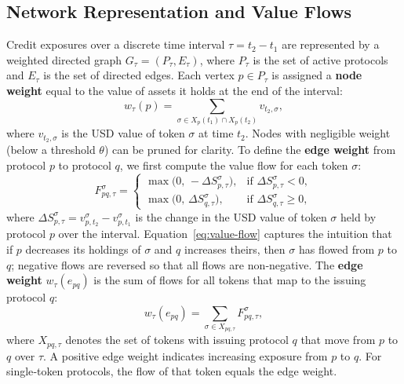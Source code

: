 \subsection{Network Representation and Value Flows}

Credit exposures over a discrete time interval $\tau = t_2 - t_1$ are represented by a weighted directed graph $G_\tau = (P_\tau, E_\tau)$, where $P_\tau$ is the set of active protocols and $E_\tau$ is the set of directed edges.  Each vertex $p\in P_\tau$ is assigned a \textbf{node weight} equal to the value of assets it holds at the end of the interval:
\begin{equation}
w_\tau(p) = \sum_{\sigma\in X_p(t_1)\cap X_p(t_2)} v_{t_2,\sigma},
\label{eq:node-weight}
\end{equation}
where $v_{t_2,\sigma}$ is the USD value of token $\sigma$ at time $t_2$.  Nodes with negligible weight (below a threshold $\theta$) can be pruned for clarity.  To define the \textbf{edge weight} from protocol $p$ to protocol $q$, we first compute the value flow for each token $\sigma$:
\begin{equation}
F^{\sigma}_{p q,\tau} =
\begin{cases}
\max\bigl(0,\, -\Delta S^{\sigma}_{p,\tau}\bigr), & \text{if } \Delta S^{\sigma}_{p,\tau} < 0,\\
\max\bigl(0,\,\Delta S^{\sigma}_{q,\tau}\bigr), & \text{if } \Delta S^{\sigma}_{q,\tau} \ge 0,
\end{cases}
\label{eq:value-flow}
\end{equation}
where $\Delta S^{\sigma}_{p,\tau}=v_{p,t_2}^{\sigma}-v_{p,t_1}^{\sigma}$ is the change in the USD value of token $\sigma$ held by protocol $p$ over the interval.  Equation~\eqref{eq:value-flow} captures the intuition that if $p$ decreases its holdings of $\sigma$ and $q$ increases theirs, then $\sigma$ has flowed from $p$ to $q$; negative flows are reversed so that all flows are non‑negative.  The \textbf{edge weight} $w_\tau(e_{p q})$ is the sum of flows for all tokens that map to the issuing protocol $q$:
\begin{equation}
w_\tau(e_{p q}) = \sum_{\sigma \in X_{p q, \tau}} F^{\sigma}_{p q,\tau},
\label{eq:edge-weight}
\end{equation}
where $X_{p q,\tau}$ denotes the set of tokens with issuing protocol $q$ that move from $p$ to $q$ over $\tau$.  A positive edge weight indicates increasing exposure from $p$ to $q$.  For single‑token protocols, the flow of that token equals the edge weight.

